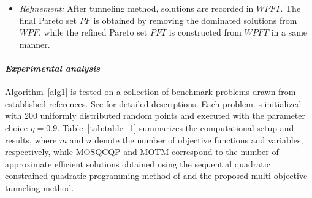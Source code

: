 \documentclass[amsa]{ipart}
\theoremstyle{plain}
\numberwithin{equation}{section}
\begin{document}
\begin{itemize}
    \item \textit{Refinement:}
   After tunneling method, solutions are recorded in $WPFT$.   
    The final Pareto set $PF$ is obtained by removing the dominated solutions from $WPF$, while the refined Pareto set $PFT$ is constructed from $WPFT$ in a same manner.
\end{itemize}
\paragraph*{{\bf \em Experimental analysis}}
Algorithm~\ref{alg1} is tested on a collection of benchmark problems drawn from established references. See \cite{adhikary2025global,Evtushenko2013-ii,fliege2016sqp, hillermeier2001generalized,preuss2006pareto,schutze2008convergence, Zilinskas2014-po} for detailed descriptions. Each problem is initialized with 200 uniformly distributed random points and executed with the parameter choice $\eta = 0.9$. Table~\ref{tab:table_1} summarizes the computational setup and results, where $m$ and $n$ denote the number of objective functions and variables, respectively, while $\mathrm{MOSQCQP}$ and $\mathrm{MOTM}$ correspond to the number of approximate efficient solutions obtained using the sequential quadratic constrained quadratic programming method of \cite{ansary2021sqcqp} and the proposed multi-objective tunneling method.  
\end{document}
